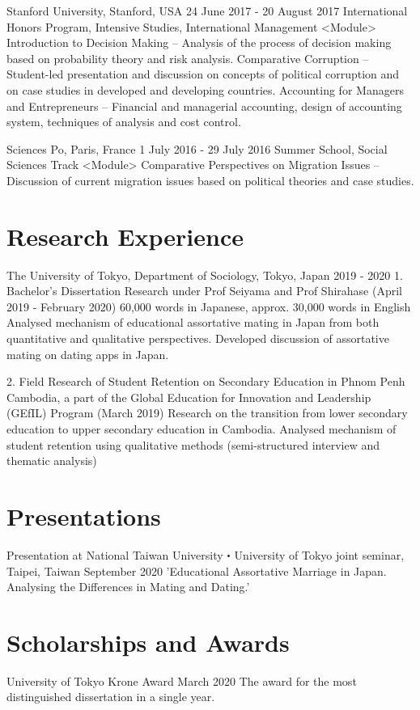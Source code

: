\documentclass{article}
\begin{document}
Stanford University, Stanford, USA                        24 June 2017 - 20 August 2017
International Honors Program, Intensive Studies, International Management
<Module>
Introduction to Decision Making – Analysis of the process of decision making based on probability theory and risk analysis.
Comparative Corruption – Student-led presentation and discussion on concepts of political corruption and on case studies in developed and developing countries.
Accounting for Managers and Entrepreneurs – Financial and managerial accounting, design of accounting system, techniques of analysis and cost control. 


Sciences Po, Paris, France	                                     1 July 2016 - 29 July 2016 
Summer School, Social Sciences Track
<Module>
Comparative Perspectives on Migration Issues – Discussion of current migration issues based on political theories and case studies.


\section{Research Experience}
The University of Tokyo, Department of Sociology, Tokyo, Japan      2019 - 2020
1. Bachelor’s Dissertation Research under Prof Seiyama and Prof Shirahase (April 2019 - February 2020)
60,000 words in Japanese, approx. 30,000 words in English
Analysed mechanism of educational assortative mating in Japan from both quantitative and qualitative perspectives.
Developed discussion of assortative mating on dating apps in Japan.

2. Field Research of Student Retention on Secondary Education in Phnom Penh Cambodia, a part of the Global Education for Innovation and Leadership (GEfIL) Program (March 2019)
Research on the transition from lower secondary education to upper secondary education in Cambodia.
Analysed mechanism of student retention using qualitative methods (semi-structured interview and thematic analysis)

\section{Presentations}
Presentation at National Taiwan University・University of Tokyo joint seminar, Taipei, Taiwan                                                                                   September 2020
'Educational Assortative Marriage in Japan.  Analysing the Differences in Mating and Dating.'


\section{Scholarships and Awards}
University of Tokyo Krone Award                                                           March 2020
The award for the most distinguished dissertation in a single year.
\end{document}

